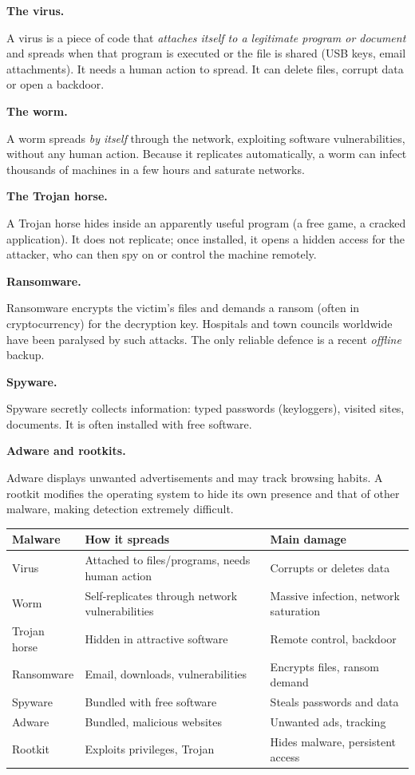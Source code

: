 \documentclass[11pt]{article}
\newcommand{\cle}[1]{{\popxbold\color{popdark}#1}}
\begin{document}
\textbf{The virus.}\par
A \cle{virus} is a piece of code that \emph{attaches itself to a legitimate program or document} and spreads when that program is executed or the file is shared (USB keys, email attachments). It needs a human action to spread. It can delete files, corrupt data or open a backdoor.

\textbf{The worm.}\par
A \cle{worm} spreads \emph{by itself} through the network, exploiting software vulnerabilities, without any human action. Because it replicates automatically, a worm can infect thousands of machines in a few hours and saturate networks.

\textbf{The Trojan horse.}\par
A \cle{Trojan horse} hides inside an apparently useful program (a free game, a cracked application). It does not replicate; once installed, it opens a hidden access for the attacker, who can then spy on or control the machine remotely.

\textbf{Ransomware.}\par
\cle{Ransomware} encrypts the victim's files and demands a ransom (often in cryptocurrency) for the decryption key. Hospitals and town councils worldwide have been paralysed by such attacks. The only reliable defence is a recent \emph{offline} backup.

\textbf{Spyware.}\par
\cle{Spyware} secretly collects information: typed passwords (keyloggers), visited sites, documents. It is often installed with free software.

\textbf{Adware and rootkits.}\par
\cle{Adware} displays unwanted advertisements and may track browsing habits. A \cle{rootkit} modifies the operating system to hide its own presence and that of other malware, making detection extremely difficult.

\begin{center}
\begin{tabularx}{\linewidth}{|l|X|X|}
\hline
\rowcolor{popblueL}\textbf{Malware} & \textbf{How it spreads} & \textbf{Main damage} \\
\hline
Virus & Attached to files/programs, needs human action & Corrupts or deletes data \\
Worm & Self-replicates through network vulnerabilities & Massive infection, network saturation \\
Trojan horse & Hidden in attractive software & Remote control, backdoor \\
Ransomware & Email, downloads, vulnerabilities & Encrypts files, ransom demand \\
Spyware & Bundled with free software & Steals passwords and data \\
Adware & Bundled, malicious websites & Unwanted ads, tracking \\
Rootkit & Exploits privileges, Trojan & Hides malware, persistent access \\
\hline
\end{tabularx}
\end{center}
\end{document}
